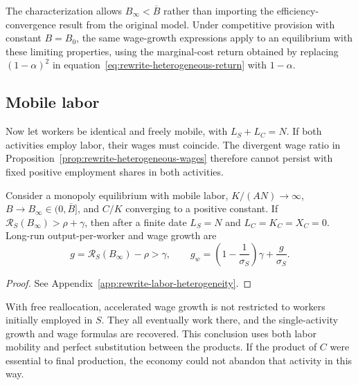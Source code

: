 The characterization allows $B_\infty<\overline B$ rather than importing
the efficiency-convergence result from the original model.
Under competitive provision with constant $B=B_0$, the same wage-growth
expressions apply to an equilibrium with these limiting properties, using
the marginal-cost return obtained by replacing $(1-\alpha)^2$ in
equation~\eqref{eq:rewrite-heterogeneous-return} with $1-\alpha$.

\subsection{Mobile labor}
\label{subsec:rewrite-mobile-labor}

Now let workers be identical and freely mobile, with $L_S+L_C=N$.
If both activities employ labor, their wages must coincide. The divergent
wage ratio in Proposition~\ref{prop:rewrite-heterogeneous-wages} therefore
cannot persist with fixed positive employment shares in both activities.

\begin{corollary}
\label{cor:rewrite-mobile-labor}
Consider a monopoly equilibrium with mobile labor, $K/(AN)\to\infty$,
$B\to B_\infty\in(0,\overline B]$, and $C/K$ converging to a positive
constant. If $\mathcal R_S(B_\infty)>\rho+\gamma$, then after a finite
date $L_S=N$ and $L_C=K_C=X_C=0$.
Long-run output-per-worker and wage growth are
\begin{equation}
 g=\mathcal R_S(B_\infty)-\rho>\gamma,\qquad
 g_w=\left(1-\frac1{\sigma_S}\right)\gamma+\frac g{\sigma_S}.
 \label{eq:rewrite-mobile-wage-growth}
\end{equation}
\end{corollary}
\begin{proof}
See Appendix~\ref{app:rewrite-labor-heterogeneity}.
\end{proof}

With free reallocation, accelerated wage growth is not restricted to workers
initially employed in $S$. They all eventually work there, and the
single-activity growth and wage formulas are recovered. This conclusion
uses both labor mobility and perfect substitution between the products.
If the product of $C$ were essential to final production, the economy could
not abandon that activity in this way.
